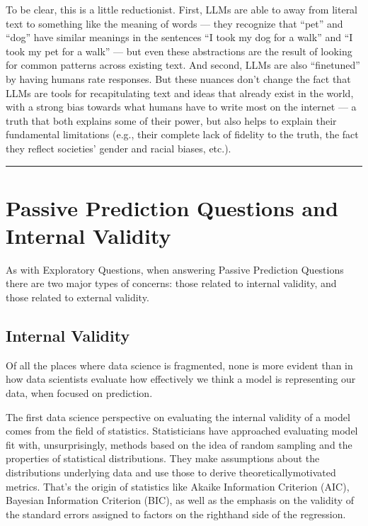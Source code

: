 \documentclass[letterpaper,10pt,english]{jupyterBook}
\begin{document}
\sphinxAtStartPar
To be clear, this is a little reductionist. First, LLMs are able to  away from literal text to something like the meaning of words — they recognize that “pet” and “dog” have similar meanings in the sentences “I took my dog for a walk” and “I took my pet for a walk” — but even these abstractions are the result of looking for common patterns across existing text. And second, LLMs are also “finetuned” by having humans rate responses. But these nuances don’t change the fact that  LLMs are tools for recapitulating text and ideas that already exist in the world, with a strong bias towards what humans have  to write most on the internet — a truth that both explains some of their power, but also helps to explain their fundamental limitations (e.g., their complete lack of fidelity to the truth, the fact they reflect societies’ gender and racial biases, etc.).


\bigskip\hrule\bigskip


\sphinxstepscope


\section{Passive Prediction Questions and Internal Validity}
\label{\detokenize{30_questions/23_passive_prediction_internal:passive-prediction-questions-and-internal-validity}}\label{\detokenize{30_questions/23_passive_prediction_internal::doc}}
\sphinxAtStartPar
As with Exploratory Questions, when answering Passive Prediction Questions there are two major types of concerns: those related to internal validity, and those related to external validity.


\subsection{Internal Validity}
\label{\detokenize{30_questions/23_passive_prediction_internal:internal-validity}}
\sphinxAtStartPar
Of all the places where data science is fragmented, none is more evident than in how data scientists evaluate how effectively we think a model is representing our data,  when focused on prediction.

\sphinxAtStartPar
The first data science perspective on evaluating the internal validity of a model comes from the field of statistics. Statisticians have approached evaluating model fit with, unsurprisingly, methods based on the idea of random sampling and the properties of statistical distributions. They make assumptions about the distributions underlying data and use those to derive theoretically\sphinxhyphen{}motivated metrics. That’s the origin of statistics like Akaike Information Criterion (AIC), Bayesian Information Criterion (BIC), as well as the emphasis on the validity of the standard errors assigned to factors on the right\sphinxhyphen{}hand side of the regression.
\end{document}
